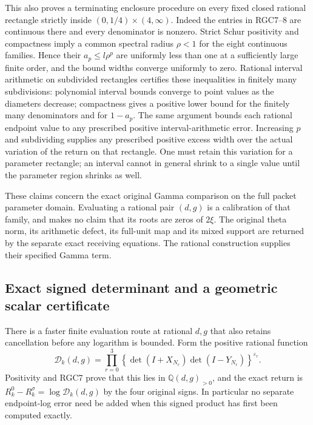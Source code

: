 This also proves a terminating enclosure procedure on every
fixed closed rational rectangle strictly inside
$(0,1/4)\times(4,\infty)$. Indeed the entries in RGC7--8 are
continuous there and every denominator is nonzero. Strict Schur
positivity and compactness imply a common spectral radius
$\rho<1$ for the eight continuous families. Hence their
$a_p\le l\rho^p$ are uniformly less than one at a sufficiently
large finite order, and the bound widths converge uniformly to
zero. Rational interval arithmetic on subdivided rectangles
certifies these inequalities in finitely many subdivisions:
polynomial interval bounds converge to point values as the
diameters decrease; compactness gives a positive lower bound
for the finitely many denominators and for $1-a_p$.
The same argument bounds each rational endpoint value to any
prescribed positive interval-arithmetic error. Increasing $p$
and subdividing supplies any prescribed positive excess width
over the actual variation of the return on that rectangle.
One must retain this variation for a parameter rectangle; an
interval cannot in general shrink to a single value until the
parameter region shrinks as well.

These claims concern the exact original Gamma comparison on
the full packet parameter domain. Evaluating a rational pair
$(d,g)$ is a calibration of that family, and makes no claim
that its roots are zeros of $2\xi$. The original theta norm,
its arithmetic defect, its full-unit map and its mixed support
are returned by the separate exact receiving equations. The
rational construction supplies their specified Gamma term.

\subsection{Exact signed determinant and a geometric scalar certificate}
There is a faster finite evaluation route at rational $d,g$ that
also retains cancellation before any logarithm is bounded. Form
the positive rational function
\[
 \mathcal D_k(d,g)=\prod_{r=0}^3
 \left\{\det(I+X_{N_r})\det(I-Y_{N_r})\right\}^{\varepsilon_r}.
 \tag{RGC12}
\]
Positivity and RGC7 prove that this lies in
$\mathbb Q(d,g)_{>0}$, and the exact return is
$R_k^0-R_k^\sigma=\log\mathcal D_k(d,g)$ by the four original
signs. In particular no separate endpoint-log error need be added
when this signed product has first been computed exactly.


